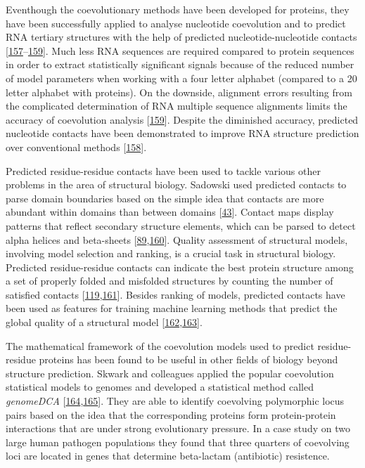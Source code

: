 \documentclass[11pt,a4paper,twoside]{book}
\theoremstyle{definition}
\theoremstyle{definition}
\theoremstyle{remark}
\begin{document}
Eventhough the coevolutionary methods have been developed for proteins,
they have been successfully applied to analyse nucleotide coevolution
and to predict RNA tertiary structures with the help of predicted
nucleotide-nucleotide contacts
{[}\protect\hyperlink{ref-Nawy2016}{157}--\protect\hyperlink{ref-DeLeonardis2015a}{159}{]}.
Much less RNA sequences are required compared to protein sequences in
order to extract statistically significant signals because of the
reduced number of model parameters when working with a four letter
alphabet (compared to a 20 letter alphabet with proteins). On the
downside, alignment errors resulting from the complicated determination
of RNA multiple sequence alignments limits the accuracy of coevolution
analysis {[}\protect\hyperlink{ref-DeLeonardis2015a}{159}{]}. Despite
the diminished accuracy, predicted nucleotide contacts have been
demonstrated to improve RNA structure prediction over conventional
methods {[}\protect\hyperlink{ref-Weinreb2015}{158}{]}.

Predicted residue-residue contacts have been used to tackle various
other problems in the area of structural biology. Sadowski used
predicted contacts to parse domain boundaries based on the simple idea
that contacts are more abundant within domains than between domains
{[}\protect\hyperlink{ref-Sadowski2013}{43}{]}. Contact maps display
patterns that reflect secondary structure elements, which can be parsed
to detect alpha helices and beta-sheets
{[}\protect\hyperlink{ref-Andreani2015a}{89},\protect\hyperlink{ref-SuvarnaVani2018}{160}{]}.
Quality assessment of structural models, involving model selection and
ranking, is a crucial task in structural biology. Predicted
residue-residue contacts can indicate the best protein structure among a
set of properly folded and misfolded structures by counting the number
of satisfied contacts
{[}\protect\hyperlink{ref-Tress2010}{119},\protect\hyperlink{ref-Wozniak2017}{161}{]}.
Besides ranking of models, predicted contacts have been used as features
for training machine learning methods that predict the global quality of
a structural model
{[}\protect\hyperlink{ref-Cao2016}{162},\protect\hyperlink{ref-Terashi2014a}{163}{]}.

The mathematical framework of the coevolution models used to predict
residue-residue proteins has been found to be useful in other fields of
biology beyond structure prediction. Skwark and colleagues applied the
popular coevolution statistical models to genomes and developed a
statistical method called \emph{genomeDCA}
{[}\protect\hyperlink{ref-Skwark2017}{164},\protect\hyperlink{ref-Gao2017}{165}{]}.
They are able to identify coevolving polymorphic locus pairs based on
the idea that the corresponding proteins form protein-protein
interactions that are under strong evolutionary pressure. In a case
study on two large human pathogen populations they found that three
quarters of coevolving loci are located in genes that determine
beta-lactam (antibiotic) resistence.
\end{document}
